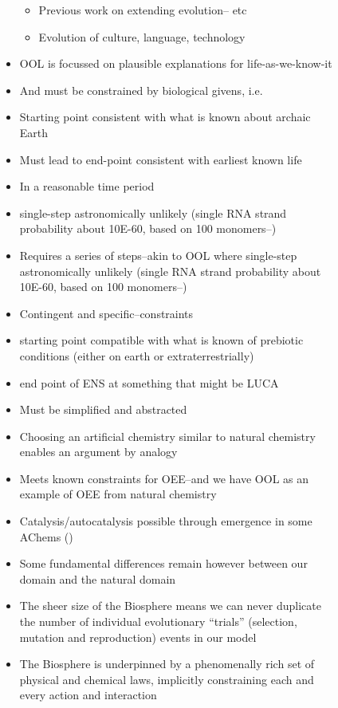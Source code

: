 \begin{figure}
\begin{framed}
\begin{itemize}
\begin{itemize}
	\item
	Previous work on extending evolution--\autocite{Bourrat2015} etc
	\item
	Evolution of culture, language, technology
\end{itemize}
\item
OOL is focussed on plausible explanations for life-as-we-know-it
\item
And must be constrained by biological givens, i.e.
\item
Starting point consistent with what is known about archaic Earth
\item
Must lead to end-point consistent with earliest known life
\item
In a reasonable time period
\item
single-step astronomically unlikely (single RNA strand probability
about 10E-60, based on 100 monomers--\autocite{Pascal2013})
\item
Requires a series of steps--akin to OOL where single-step
astronomically unlikely (single RNA strand probability about 10E-60,
based on 100 monomers--\autocite{Pascal2013})
\item
Contingent and specific--constraints
\item
starting point compatible with what is known of prebiotic conditions
(either on earth or extraterrestrially)
\item
end point of ENS at something that might be LUCA
\item
Must be simplified and abstracted
\item
Choosing an artificial chemistry similar to natural chemistry enables
an argument by analogy
\item
Meets known constraints for OEE--and we have OOL as an example of OEE
from natural chemistry
\item
Catalysis/autocatalysis possible through emergence in some AChems
(\eg \autocite{Virgo2013})
\item
Some fundamental differences remain however between our domain and the
natural domain
\item
The sheer size of the Biosphere means we can never duplicate the
number of individual evolutionary ``trials'' (selection, mutation and
reproduction) events in our model
\item
The Biosphere is underpinned by a phenomenally rich set of physical
and chemical laws, implicitly constraining each and every action and
interaction
\end{itemize}


\end{framed}
\end{figure}
